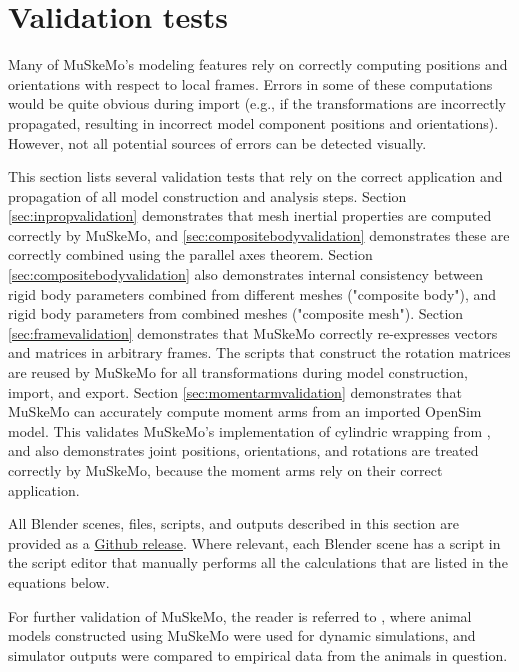 \documentclass{article}
\begin{document}
\section{Validation tests}

Many of MuSkeMo's modeling features rely on correctly computing positions and orientations with respect to local frames. Errors in some of these computations would be quite obvious during import (e.g., if the transformations are incorrectly propagated, resulting in incorrect model component positions and orientations). However, not all potential sources of errors can be detected visually. 

This section lists several validation tests that rely on the correct application and propagation of all model construction and analysis steps. Section \ref{sec:inpropvalidation} demonstrates that mesh inertial properties are computed correctly by MuSkeMo, and \ref{sec:compositebodyvalidation} demonstrates these are correctly combined using the parallel axes theorem. Section \ref{sec:compositebodyvalidation} also demonstrates internal consistency between rigid body parameters combined from different meshes ("composite body"), and rigid body parameters from combined meshes ("composite mesh"). Section \ref{sec:framevalidation} demonstrates that MuSkeMo correctly re-expresses vectors and matrices in arbitrary frames. The scripts that construct the rotation matrices are reused by MuSkeMo for all transformations during model construction, import, and export. Section \ref{sec:momentarmvalidation} demonstrates that MuSkeMo can accurately compute moment arms from an imported OpenSim model. This validates MuSkeMo's implementation of cylindric wrapping from \cite{garnerObstacleSetMethodRepresenting2000}, and also demonstrates joint positions, orientations, and rotations are treated correctly by MuSkeMo, because the moment arms rely on their correct application.

All Blender scenes, files, scripts, and outputs described in this section are provided as a \href{https://github.com/PashavanBijlert/MuSkeMo/releases/tag/v0.x}{Github release}. Where relevant, each Blender scene has a script in the script editor that manually performs all the calculations that are listed in the equations below.

For further validation of MuSkeMo, the reader is referred to \cite{vanbijlertMusclecontrolledPhysicsSimulations2024,vanbijlertMuscleDrivenPredictivePhysics2024}, where animal models constructed using MuSkeMo were used for dynamic simulations, and simulator outputs were compared to empirical data from the animals in question.
\end{document}
